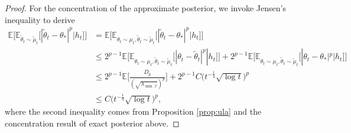\documentclass[11pt]{article}
\theoremstyle{plain}
\theoremstyle{definition}
\theoremstyle{remark}
\begin{document}
\begin{proof}
For the concentration of the approximate posterior, we invoke Jensen's inequality to derive
\begin{equation}\nonumber
\begin{split}
    \mathbb{E}\bigg[\mathbb{E}_{\tilde{\theta}_t \sim \tilde{\mu}_t}\big[| \tilde{\theta}_t - \theta_* |^p | h_{t}\big ]\bigg] &= \mathbb{E}\bigg[\mathbb{E}_{\theta_t \sim \mu_t, \tilde{\theta}_t \sim \tilde{\mu}_t}\big[| \tilde{\theta}_t - \theta_* |^p\big | h_{t}]\bigg]\\
    &\leq 2^{p-1}\mathbb{E}\bigg[\mathbb{E}_{\theta_t \sim \mu_t, \tilde{\theta}_t \sim \tilde{\mu}_t}\big[| \theta_t- \tilde{\theta}_t |^p | h_{t} \big ]\bigg]+2^{p-1}\mathbb{E}\bigg[\mathbb{E}_{\theta_t \sim \mu_t, \tilde{\theta}_t \sim \tilde{\mu}_t}\big[| \theta_t - \theta_* |^p|h_{t} \big ]\bigg]\\
    &\leq 2^{p-1}\mathbb{E}\bigg[\frac{D_p}{(\sqrt{\lambda_{\min,t}})^p}\bigg]+2^{p-1}C\bigg(t^{-\frac{1}{4}}\sqrt{\log t}\bigg)^p\\
    &\leq C\bigg(t^{-\frac{1}{4}}\sqrt{\log t}\bigg)^p,
\end{split}
\end{equation}
where the second inequality comes from Proposition \ref{prop:ula} and the concentration result of exact posterior above.
\end{proof}
\end{document}
